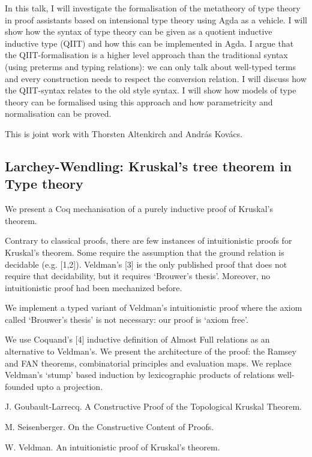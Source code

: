 \documentclass[a4paper,10pt]{scrartcl}
\begin{document}
In this talk, I will investigate the formalisation of the metatheory of type theory in proof assistants based on intensional type theory using Agda as a vehicle. 
I will show how the syntax of type theory can be given as a quotient inductive inductive type (QIIT) and how this can be implemented in Agda. 
I argue that the QIIT-formalisation is a higher level approach than the traditional syntax (using preterms and typing relations): 
we can only talk about well-typed terms and every construction needs to respect the conversion relation. 
I will discuss how the QIIT-syntax relates to the old style syntax. I will show how models of type theory can be formalised using this approach and how parametricity and normalisation can be proved.

This is joint work with Thorsten Altenkirch and András Kovács.

\subsection*{Larchey-Wendling: Kruskal's tree theorem in Type theory}

We present a Coq mechanisation of a purely inductive proof of Kruskal's theorem.

Contrary to classical proofs, there are few instances of intuitionistic proofs for Kruskal's theorem. 
Some require the assumption that the ground relation is decidable (e.g. [1,2]). 
Veldman's [3] is the only published proof that does not require that decidability, but it requires `Brouwer's thesis'. Moreover, no intuitionistic proof had been mechanized before.

We implement a typed variant of Veldman's intuitionistic proof where the axiom called `Brouwer's thesis' is not necessary: our proof is `axiom free'.

We use Coquand's [4] inductive definition of Almost Full relations as an alternative to Veldman's. We present the architecture of the proof:
the Ramsey and FAN theorems, combinatorial principles and evaluation maps. We replace Veldman's `stump' based induction by lexicographic products of relations well-founded upto a projection.

\bigskip

\noindent
[1] J. Goubault-Larrecq. A Constructive Proof of the Topological Kruskal Theorem.

\noindent
[2] M. Seisenberger. On the Constructive Content of Proofs.

\noindent
[3] W. Veldman. An intuitionistic proof of Kruskal's theorem.
\end{document}
